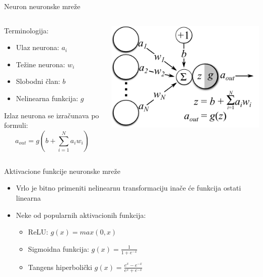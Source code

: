 \documentclass{beamer}
\begin{document}
\begin{frame}{Neuron neuronske mreže}
    \begin{columns}
    \begin{column}{0.5\textwidth}
        Terminologija:
        \begin{itemize}
            \item Ulaz neurona: $a_i$
            \item Težine neurona: $w_i$
            \item Slobodni član: $b$
            \item Nelinearna funkcija: $g$
        \end{itemize}

        Izlaz neurona se izračunava po formuli:
        $$
            a_{out} = g(b + \sum_{i=1}^{N} a_i w_i)
        $$
    \end{column}
    \begin{column}{0.5\textwidth}  %
        \begin{center}
            \includegraphics[scale=0.9]{./slike/neuron.png}
        \end{center}
    \end{column}
    \end{columns}
\end{frame}
\begin{frame}{Aktivacione funkcije neuronske mreže}
    \begin{itemize}
        \item Vrlo je bitno primeniti nelinearnu transformaciju inače će funkcija ostati linearna
        \item Neke od popularnih aktivacionih funkcija:
        \begin{itemize}
            \item ReLU: $ g(x) = max(0, x)$
            \item Sigmoidna funkcija: $ g(x) = \frac{1}{1 + e^{-x}} $
            \item Tangens hiperbolički $ g(x) = \frac{e^x - e^{-x}}{e^x + e^{-x}} $
        \end{itemize}
    \end{itemize}
\end{frame}
\end{document}
